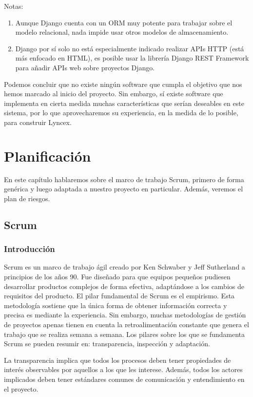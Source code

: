 \documentclass[openright,twoside,12pt]{book}
\begin{document}
Notas:
\begin{enumerate}
    \item Aunque Django cuenta con un ORM muy potente para trabajar sobre el modelo relacional, nada impide usar otros modelos de almacenamiento.
    \item Django por sí solo no está especialmente indicado realizar APIs HTTP (está más enfocado en HTML), es posible usar la librería Django REST Framework para añadir APIs web sobre proyectos Django.
\end{enumerate}

Podemos concluir que no existe ningún software que cumpla el objetivo que nos hemos marcado al inicio del proyecto. Sin embargo, sí existe software que implementa en cierta medida muchas características que serían deseables en este sistema, por lo que aprovecharemos su experiencia, en la medida de lo posible, para construir Lyncex.

\chapter{Planificación}

En este capítulo hablaremos sobre el marco de trabajo Scrum\cite{scrum}, primero de forma genérica y luego adaptada a nuestro proyecto en particular. Además, veremos el plan de riesgos.
\section{Scrum}

\subsection{Introducción}
Scrum es un marco de trabajo ágil creado por Ken Schwaber y Jeff Sutherland a principios de los años 90. Fue diseñado para que equipos pequeños pudiesen desarrollar productos complejos de forma efectiva, adaptándose a los cambios de requisitos del producto.
El pilar fundamental de Scrum es el empirismo. Esta metodología sostiene que la única forma de obtener información correcta y precisa es mediante la experiencia. Sin embargo, muchas metodologías de gestión de proyectos apenas tienen en cuenta la retroalimentación constante que genera el trabajo que se realiza semana a semana. Los pilares sobre los que se fundamenta Scrum se pueden resumir en: transparencia, inspección y adaptación.

La transparencia implica que todos los procesos deben tener propiedades de interés observables por aquellos a los que les interese. Además, todos los actores implicados deben tener estándares comunes de comunicación y entendimiento en el proyecto.
\end{document}

